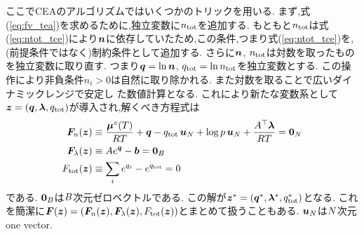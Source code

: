 ここでCEAのアルゴリズムではいくつかのトリックを用いる. まず,式(\ref{eq:fv_tea})を求めるために,独立変数に$n_\mathrm{tot}$を追加する. もともと$n_\mathrm{tot}$は式(\ref{eq:ntot_tce})により$\boldsymbol{n}$に依存していたため,この条件,つまり式(\ref{eq:ntot_tce})を,(前提条件ではなく)制約条件として追加する. さらに$\boldsymbol{n}$, $n_\mathrm{tot}$は対数を取ったものを独立変数に取り直す. つまり$\boldsymbol{q} = \ln{\boldsymbol{n}}$, $q_\mathrm{tot} = \ln{n_\mathrm{tot}}$を独立変数とする.  この操作により非負条件$n_i > 0$は自然に取り除かれる. また対数を取ることで広いダイナミックレンジで安定し
た数値計算となる. これにより新たな変数系として$\boldsymbol{z} = (\boldsymbol{q}, \boldsymbol{\lambda}, q_\mathrm{tot})$が導入され,解くべき方程式は
\begin{align}
\label{eq:Lpartialncea}
    \boldsymbol{F}_n (\boldsymbol{z}) &\equiv \frac{\boldsymbol{\mu}^\circ(T)}{RT} + \boldsymbol{q} - q_\mathrm{tot} \, \boldsymbol{u}_N + \log{p} \, \boldsymbol{u}_N  + \frac{A^\top \boldsymbol{\lambda}}{RT} = \boldsymbol{0}_N \\
    \boldsymbol{F}_\lambda (\boldsymbol{z}) &\equiv A e^{\boldsymbol{q}} - \boldsymbol{b} = \boldsymbol{0}_B \\
    F_\mathrm{tot} (\boldsymbol{z}) &\equiv \sum_i {e^{q_i}} - e^{q_\mathrm{tot}} = 0
\end{align}
である. $\boldsymbol{0}_B$は$B$次元ゼロベクトルである. この解が$\boldsymbol{z}^\ast = (\boldsymbol{q}^\ast, \boldsymbol{\lambda}^\ast, q_\mathrm{tot}^\ast)$となる. これを簡潔に$\boldsymbol{F} (\boldsymbol{z}) = (\boldsymbol{F}_n (\boldsymbol{z}), \boldsymbol{F}_\lambda (\boldsymbol{z}), F_\mathrm{tot} (\boldsymbol{z}))$とまとめて扱うこともある.  $\boldsymbol{u}_N$は$N$次元 one vector.

